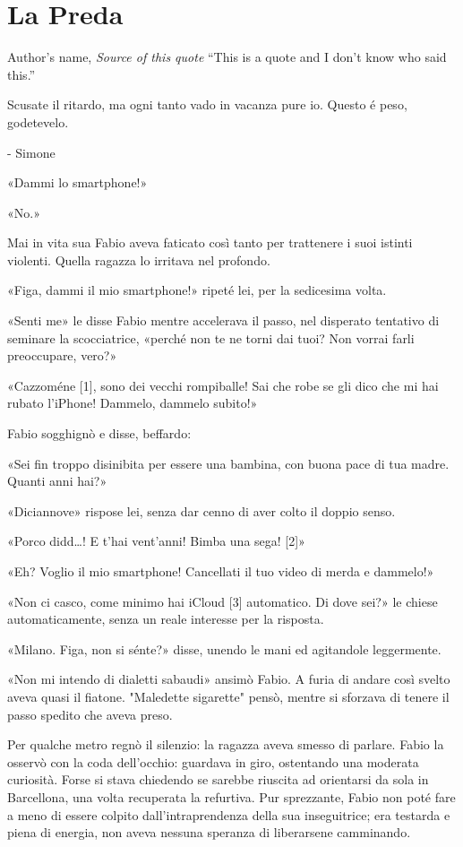\chapter{La Preda}

\begin{chapquote}{Author's name, \textit{Source of this quote}}
``This is a quote and I don't know who said this.''
\end{chapquote}


Scusate il ritardo, ma ogni tanto vado in vacanza pure io. Questo é peso, godetevelo.

- Simone

«Dammi lo smartphone!»

«No.»

Mai in vita sua Fabio aveva faticato così tanto per trattenere i suoi istinti violenti. Quella ragazza lo irritava nel profondo.

«Figa, dammi il mio smartphone!» ripeté lei, per la sedicesima volta.

«Senti me» le disse Fabio mentre accelerava il passo, nel disperato tentativo di seminare la scocciatrice, «perché non te ne torni dai tuoi? Non vorrai farli preoccupare, vero?»

«Cazzoméne [1], sono dei vecchi rompiballe! Sai che robe se gli dico che mi hai rubato l'iPhone! Dammelo, dammelo subito!»

Fabio sogghignò e disse, beffardo:

«Sei fin troppo disinibita per essere una bambina, con buona pace di tua madre. Quanti anni hai?»

«Diciannove» rispose lei, senza dar cenno di aver colto il doppio senso.

«Porco didd\ldots! E t'hai vent'anni! Bimba una sega! [2]»

«Eh? Voglio il mio smartphone! Cancellati il tuo video di merda e dammelo!»

«Non ci casco, come minimo hai iCloud [3] automatico. Di dove sei?» le chiese automaticamente, senza un reale interesse per la risposta.

«Milano. Figa, non si sénte?» disse, unendo le mani ed agitandole leggermente.

«Non mi intendo di dialetti sabaudi» ansimò Fabio. A furia di andare così svelto aveva quasi il fiatone. "Maledette sigarette" pensò, mentre si sforzava di tenere il passo spedito che aveva preso.

Per qualche metro regnò il silenzio: la ragazza aveva smesso di parlare. Fabio la osservò con la coda dell'occhio: guardava in giro, ostentando una moderata curiosità. Forse si stava chiedendo se sarebbe riuscita ad orientarsi da sola in Barcellona, una volta recuperata la refurtiva. Pur sprezzante, Fabio non poté fare a meno di essere colpito dall'intraprendenza della sua inseguitrice; era testarda e piena di energia, non aveva nessuna speranza di liberarsene camminando.

